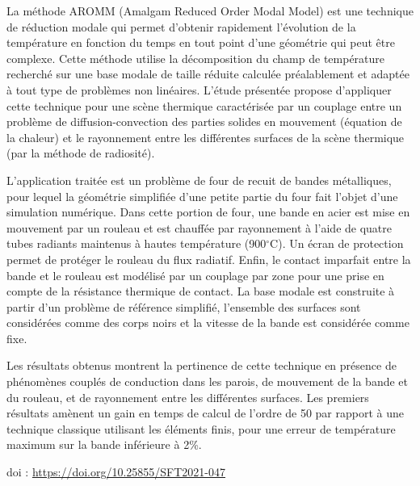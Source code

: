 {\normalsize
La méthode AROMM (Amalgam Reduced Order Modal Model) est une technique de réduction modale qui permet d'obtenir rapidement l'évolution de la température en fonction du temps en tout point d'une géométrie qui peut être complexe. Cette méthode utilise la décomposition du champ de température recherché sur une base modale de taille réduite calculée préalablement et adaptée à tout type de problèmes non linéaires. L'étude présentée propose d'appliquer cette technique pour une scène thermique caractérisée par un couplage entre un problème de diffusion-convection des parties solides en mouvement (équation de la chaleur) et le rayonnement entre les différentes surfaces de la scène thermique (par la méthode de radiosité). 



L'application traitée est un problème de four de recuit de bandes métalliques, pour lequel la géométrie simplifiée d'une petite partie du four fait l'objet d'une simulation numérique. Dans cette portion de four, une bande en acier est mise en mouvement par un rouleau et est chauffée par rayonnement à l'aide de quatre tubes radiants maintenus à hautes température (900$^{\circ}$C). Un écran de protection permet de protéger le rouleau du flux radiatif. Enfin, le contact imparfait entre la bande et le rouleau est modélisé par un couplage par zone pour une prise en compte de la résistance thermique de contact. La base modale est construite à partir d'un problème de référence simplifié, l'ensemble des surfaces sont considérées comme des corps noirs et la vitesse de la bande est considérée comme fixe. 



Les résultats obtenus montrent la pertinence de cette technique en présence de phénomènes couplés de conduction dans les parois, de mouvement de la bande et du rouleau, et de rayonnement entre les différentes surfaces. Les premiers résultats amènent un gain en temps de calcul de l'ordre de 50 par rapport à une technique classique utilisant les éléments finis, pour une erreur de température maximum sur la bande inférieure à 2\%.

 \vfill doi : \url{https://doi.org/10.25855/SFT2021-047}

}
 
